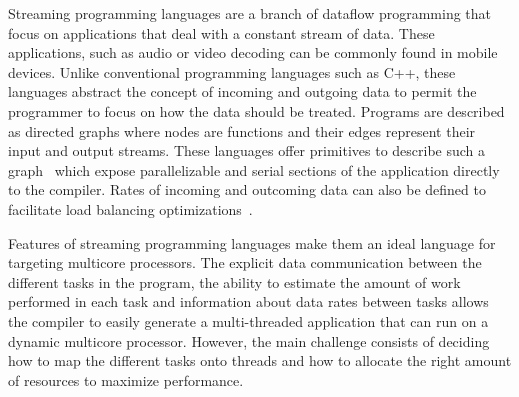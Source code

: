 
Streaming programming languages are a branch of dataflow programming that focus on applications that deal with a constant stream of data.
These applications, such as audio or video decoding can be commonly found in mobile devices.
Unlike conventional programming languages such as C++, these languages abstract the concept of incoming and outgoing data to permit the programmer to focus on how the data should be treated.
Programs are described as directed graphs where nodes are functions and their edges represent their input and output streams. 
These languages offer primitives to describe such a graph~\cite{theis2002streamit} which expose parallelizable and serial sections of the application directly to the compiler. 
Rates of incoming and outcoming data can also be defined to facilitate load balancing optimizations~\cite{chen2005rawstream}.

Features of streaming programming languages make them an ideal language for targeting multicore processors.
The explicit data communication between the different tasks in the program, the ability to estimate the amount of work performed in each task and information about data rates between tasks allows the compiler to easily generate a multi-threaded application that can run on a dynamic multicore processor.
However, the main challenge consists of deciding how to map the different tasks onto threads and how to allocate the right amount of resources to maximize performance.

